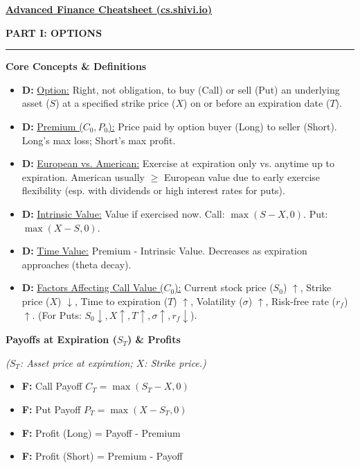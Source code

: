 \documentclass[7pt,landscape]{extarticle} %
\newcommand{\cheatsheetsection}[1]{%
  \vspace{0.25ex plus 0.1ex minus 0.05ex}%
  \noindent\color{SecTitleColor}\textbf{\sffamily\small\MakeUppercase{#1}}%
  \par\vspace{0.02ex}%
  {\color{RuleColor}\hrule height 0.3pt}\par\vspace{0.15ex}%
}
\newcommand{\cheatsheetsubsubsection}[1]{%
  \vspace{0.15ex plus 0.05ex minus 0.05ex}%
  \noindent\textbf{\sffamily\scriptsize #1}%
  \par\vspace{0.05ex}%
}
\newcommand{\D}[1]{\textbf{\textcolor{DefColor}{D:}} \uline{#1}}
\newcommand{\F}[1]{\textbf{\textcolor{FormColor}{F:}} #1}
\newcommand{\SF}[1]{\textit{\small (#1)}} %
\begin{document}
\renewcommand{\small}{\fontsize{8pt}{8pt}\selectfont} %
\small %

\begin{multicols*}{4} %
  \RaggedRight %

  \noindent\textbf{\underline{\sffamily Advanced Finance Cheatsheet (cs.shivi.io)}} %
  \vspace{0.1ex} %

  \cheatsheetsection{Part I: Options}
  
  \cheatsheetsubsubsection{Core Concepts \& Definitions}
  \begin{itemize}
    \item \D{Option:} Right, not obligation, to buy (Call) or sell (Put) an underlying asset ($S$) at a specified strike price ($X$) on or before an expiration date ($T$).
    \item \D{Premium ($C_0, P_0$):} Price paid by option buyer (Long) to seller (Short). Long's max loss; Short's max profit.
    \item \D{European vs. American:} Exercise at expiration only vs. anytime up to expiration. American usually $\ge$ European value due to early exercise flexibility (esp. with dividends or high interest rates for puts).
    \item \D{Intrinsic Value:} Value if exercised now. Call: $\max(S-X,0)$. Put: $\max(X-S,0)$.
    \item \D{Time Value:} Premium - Intrinsic Value. Decreases as expiration approaches (theta decay).
    \item \D{Factors Affecting Call Value ($C_0$):} Current stock price ($S_0$) $\uparrow$, Strike price ($X$) $\downarrow$, Time to expiration ($T$) $\uparrow$, Volatility ($\sigma$) $\uparrow$, Risk-free rate ($r_f$) $\uparrow$. (For Puts: $S_0 \downarrow, X \uparrow, T \uparrow, \sigma \uparrow, r_f \downarrow$).
  \end{itemize}
  
  \cheatsheetsubsubsection{Payoffs at Expiration ($S_T$) \& Profits}
  \SF{$S_T$: Asset price at expiration; $X$: Strike price.}
  \begin{itemize}
    \item \F{Call Payoff $C_T = \max(S_T - X, 0)$}
    \item \F{Put Payoff $P_T = \max(X - S_T, 0)$}
    \item \F{Profit (Long) = Payoff - Premium}
    \item \F{Profit (Short) = Premium - Payoff}
  \end{itemize}
  

\end{multicols*}
\end{document}
